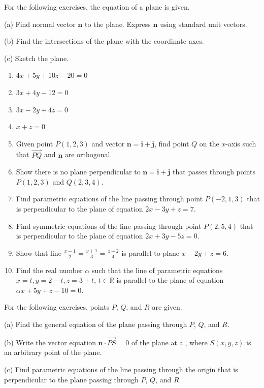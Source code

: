 \documentclass{exercises}
\begin{document}
For the following exercises, the equation of a plane is given.


(a) Find normal vector $\mathbf{n}$ to the plane. Express $\mathbf{n}$ using standard unit vectors.


(b) Find the intersections of the plane with the coordinate axes.


(c) Sketch the plane.

\begin{enumerate}[resume]
\item \techrequired $4x+5y+10z-20=0$
\item $3x+4y-12=0$
\item $3x-2y+4z=0$
\item $x+z=0$
\item Given point $P(1,2,3)$ and vector $\mathbf{n}=\mathbf{i}+\mathbf{j}$, find point $Q$ on the $x$-axis such that $\overset{\to}{PQ}$ and $\mathbf{n}$ are orthogonal.
\item Show there is no plane perpendicular to $\mathbf{n}=\mathbf{i}+\mathbf{j}$ that passes through points $P(1,2,3)$ and $Q(2,3,4)$.
\item Find parametric equations of the line passing through point $P(-2,1,3)$ that is perpendicular to the plane of equation $2x-3y+z=7$.
\item Find symmetric equations of the line passing through point $P(2,5,4)$ that is perpendicular to the plane of equation $2x+3y-5z=0$.
\item Show that line $\frac{x-1}{2}=\frac{y+1}{3}=\frac{z-2}{4}$ is parallel to plane $x-2y+z=6$.
\item Find the real number $\alpha$ such that the line of parametric equations $x=t,y=2-t,z=3+t$, $t\in \mathbb{R}$ is parallel to the plane of equation $\alpha x+5y+z-10=0$.
\end{enumerate}

For the following exercises, points $P$, $Q$, and $R$ are given.


(a) Find the general equation of the plane passing through $P$, $Q$, and $R$.


(b) Write the vector equation $\mathbf{n}\cdot \overset{\to}{PS}=0$ of the plane at a., where $S(x,y,z)$ is an arbitrary point of the plane.


(c) Find parametric equations of the line passing through the origin that is perpendicular to the plane passing through $P$, $Q$, and $R$.
\end{document}
